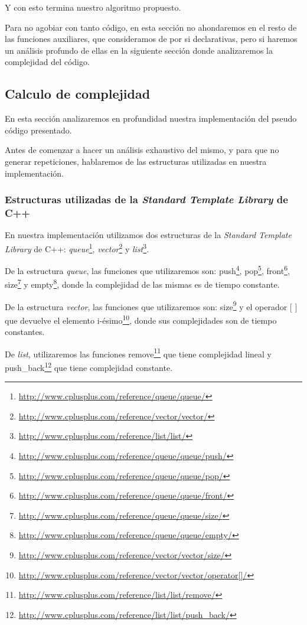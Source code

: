 Y con esto termina nuestro algoritmo propuesto.

Para no agobiar con tanto código, en esta sección no ahondaremos en el resto de las funciones auxiliares, que consideramos de por si declarativas, pero si haremos un análisis profundo de ellas en la siguiente sección donde analizaremos la complejidad del código.


\subsection{Calculo de complejidad}

En esta sección analizaremos en profundidad nuestra implementación del pseudo código presentado.

Antes de comenzar a hacer un análisis exhaustivo del mismo, y para que no generar repeticiones, hablaremos de las estructuras utilizadas en nuestra implementación.

\subsubsection{Estructuras utilizadas de la \textit{Standard Template Library} de C++}

En nuestra implementación utilizamos dos estructuras de la \textit{Standard Template Library} de C++: \emph{queue}\footnote{\url{http://www.cplusplus.com/reference/queue/queue/}}, \emph{vector}\footnote{\url{http://www.cplusplus.com/reference/vector/vector/}} y \emph{list}\footnote{\url{http://www.cplusplus.com/reference/list/list/}}.

De la estructura \emph{queue}, las funciones que utilizaremos son: push\footnote{\url{http://www.cplusplus.com/reference/queue/queue/push/}}, pop\footnote{\url{http://www.cplusplus.com/reference/queue/queue/pop/}}, front\footnote{\url{http://www.cplusplus.com/reference/queue/queue/front/}}, size\footnote{\url{http://www.cplusplus.com/reference/queue/queue/size/}} y empty\footnote{\url{http://www.cplusplus.com/reference/queue/queue/empty/}}, donde la complejidad de las mismas es de tiempo constante.

De la estructura \emph{vector}, las funciones que utilizaremos son: size\footnote{\url{http://www.cplusplus.com/reference/vector/vector/size/}} y el operador [ ] que devuelve el elemento i-ésimo\footnote{\url{http://www.cplusplus.com/reference/vector/vector/operator[]/}}, donde sus complejidades son de tiempo constantes.

De \emph{list}, utilizaremos las funciones remove\footnote{\url{http://www.cplusplus.com/reference/list/list/remove/}} que tiene complejidad lineal y push_back\footnote{\url{http://www.cplusplus.com/reference/list/list/push_back/}} que tiene complejidad constante.

